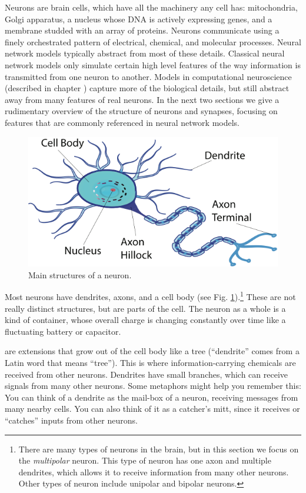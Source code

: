 Neurons are brain cells, which have all the machinery any cell has: mitochondria, Golgi apparatus, a nucleus whose DNA is actively expressing genes, and a membrane studded with an array of proteins. Neurons communicate using a finely orchestrated pattern of electrical, chemical, and molecular processes. Neural network models typically abstract from most of these details. Classical neural network models only simulate certain high level features of the way information is transmitted from one neuron to another. Models in computational neuroscience (described in chapter ) capture more of the biological details, but still abstract away from many features of real neurons. In the next two sections we give a rudimentary overview of the structure of neurons and synapses, focusing on features that are commonly referenced in neural network models.

\begin{figure}[h]
\centering
\includegraphics[width=.5\textwidth]{./images/neuron.png}
\caption[Pamela Payne.]{Main structures of a neuron.}
\label{f:neuron}
\end{figure}

Most neurons have dendrites, axons, and a cell body (see Fig. \ref{f:neuron}).\footnote{There are many types of neurons in the brain, but in this section we focus on the \emph{multipolar} neuron. This type of neuron has one axon and multiple dendrites, which allows it to receive information from many other neurons. Other types of neuron include unipolar and bipolar neurons.}  These are not really distinct structures, but are parts of the cell. The neuron as a whole is a kind of container, whose overall charge is changing constantly over time like a fluctuating battery or capacitor. 

 are extensions that grow out of the cell body like a tree (``dendrite'' comes from a Latin word that means ``tree''). This is where information-carrying chemicals are received from other neurons. Dendrites have small branches, which can receive signals from many other neurons. Some metaphors might help you remember this: You can think of a dendrite as the mail-box of a neuron, receiving messages from many nearby cells. You can also think of it as a catcher's mitt, since it receives or ``catches'' inputs from other neurons.

